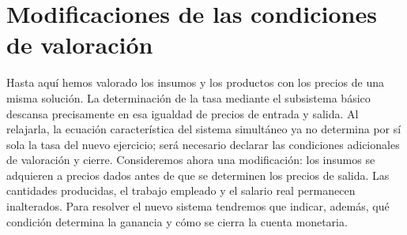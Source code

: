 \documentclass[10pt,twoside]{article}
\begin{document}
\section{Modificaciones de las condiciones de valoración}
Hasta aquí hemos valorado los insumos y los productos con los precios de una misma solución. La determinación de la tasa mediante el subsistema básico descansa precisamente en esa igualdad de precios de entrada y salida. Al relajarla, la ecuación característica del sistema simultáneo ya no determina por sí sola la tasa del nuevo ejercicio; será necesario declarar las condiciones adicionales de valoración y cierre. Consideremos ahora una modificación: los insumos se adquieren a precios dados antes de que se determinen los precios de salida. Las cantidades producidas, el trabajo empleado y el salario real permanecen inalterados. Para resolver el nuevo sistema tendremos que indicar, además, qué condición determina la ganancia y cómo se cierra la cuenta monetaria.
\end{document}

